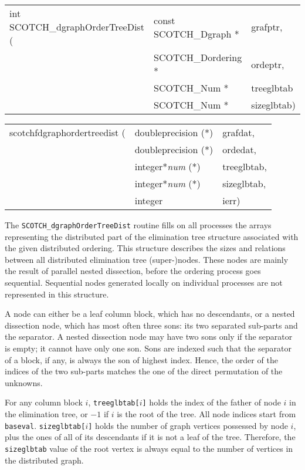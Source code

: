 \begin{itemize}
\progsyn

{\tt\begin{tabular}{l@{}ll}
int SCOTCH\_dgraphOrderTreeDist ( & const SCOTCH\_Dgraph * & grafptr,   \\
                                  & SCOTCH\_Dordering *    & ordeptr,   \\
                                  & SCOTCH\_Num *          & treeglbtab \\
                                  & SCOTCH\_Num *          & sizeglbtab)
\end{tabular}}

{\tt\begin{tabular}{l@{}ll}
scotchfdgraphordertreedist ( & doubleprecision (*)   & grafdat,    \\
                             & doubleprecision (*)   & ordedat,    \\
                             & integer*{\it num} (*) & treeglbtab, \\
                             & integer*{\it num} (*) & sizeglbtab, \\
                             & integer               & ierr)
\end{tabular}}

\progdes

The {\tt SCOTCH\_dgraphOrderTreeDist} routine fills on all processes
the arrays representing the distributed part of the elimination tree
structure associated with the given distributed ordering. This structure
describes the sizes and relations between all distributed elimination
tree (super-)nodes. These nodes are mainly the result of parallel
nested dissection, before the ordering process goes sequential.
Sequential nodes generated locally on individual processes are not
represented in this structure.

A node can either be a leaf column block, which has no
descendants, or a nested dissection node, which has most often
three sons: its two separated sub-parts and the separator. A
nested dissection node may have two sons only if the separator is
empty; it cannot have only one son. Sons are indexed such that the
separator of a block, if any, is always the son of highest index.
Hence, the order of the indices of the two sub-parts matches the one
of the direct permutation of the unknowns.

For any column block $i$, {\tt treeglbtab[}$i${\tt ]} holds the index
of the father of node $i$ in the elimination tree, or $-1$ if $i$ is
the root of the tree. All node indices start from
{\tt baseval}. {\tt size\lbt glb\lbt tab[}$i${\tt ]} holds the number
of graph vertices possessed by node $i$, plus the ones of all
of its descendants if it is not a leaf of the tree. Therefore, the
{\tt size\lbt glb\lbt tab} value of the root vertex is always equal to
the number of vertices in the distributed graph.


\end{itemize}
